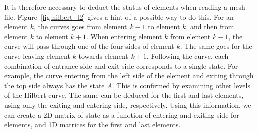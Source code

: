 It is therefore necessary to deduct the status of elements when reading a mesh file.
Figure~\ref{fig:hilbert_l2} gives a hint of a possible way to do this. For an element $k$, the
curves goes from element $k - 1$ to element $k$, and then from element $k$ to element $k + 1$. When
entering element $k$ from element $k - 1$, the curve will pass through one of the four sides of
element $k$. The same goes for the curve leaving element $k$ towards element $k + 1$. Following the
curve, each combination of entrance side and exit side corresponds to a single state. For example,
the curve entering from the left side of the element and exiting through the top side always has the
state $A$. This is confirmed by examining other levels of the Hilbert curve. The same can be deduced
for the first and last elements, using only the exiting and entering side, respectively. Using this
information, we can create a 2D matrix of state as a function of entering and exiting side for
elements, and 1D matrices for the first and last elements.

